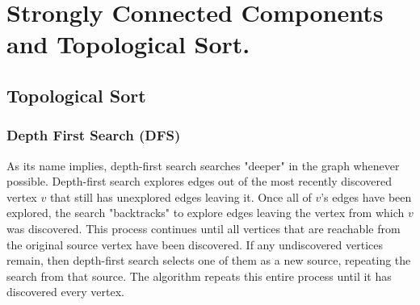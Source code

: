 


\ifdefined\BOOK
\else
\setcounter{chapter}{9}
\fi
\chapter{Strongly Connected Components and Topological Sort.} 


\section{Topological Sort}





\subsection{Depth First Search (DFS)}
As its name implies, depth-first search searches "deeper" in the graph whenever possible. Depth-first search explores edges out of the most recently discovered vertex $v$ that still has unexplored edges leaving it. Once all of $ v$'s edges have been explored, the search "backtracks" to explore edges leaving the vertex from which $v$ was discovered. This process continues until all vertices that are reachable from the original source vertex have been discovered. If any undiscovered vertices remain, then depth-first search selects one of them as a new source, repeating the search from that source. The algorithm repeats this entire process until it has discovered every vertex.


